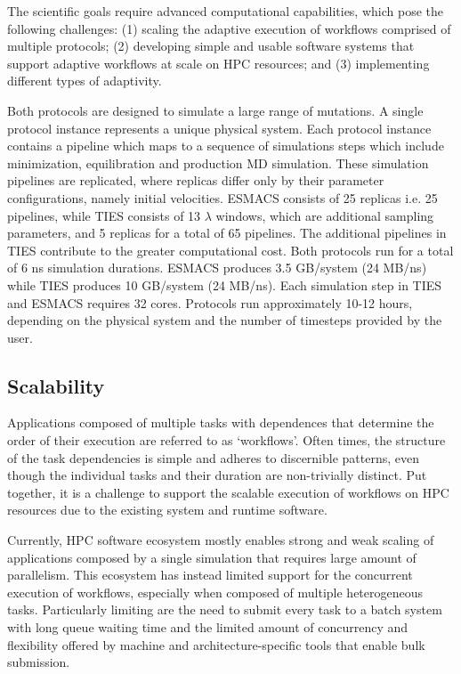 \documentclass[conference]{IEEEtran}
\begin{document}

The scientific goals require advanced computational capabilities, which pose
the following challenges: (1) scaling the adaptive execution of workflows
comprised of multiple protocols; (2) developing simple and usable software
systems that support adaptive workflows at scale on HPC resources; and (3)
implementing different types of adaptivity.

Both protocols are designed to simulate a large range of mutations. 
A single protocol instance represents a unique physical system. Each protocol 
instance contains a pipeline which maps to a sequence of simulations steps which 
include minimization, equilibration and production MD simulation. These 
simulation pipelines are replicated, where replicas differ only by their 
parameter configurations, namely initial velocities. ESMACS 
consists of 25 replicas i.e. 25 pipelines, while
TIES consists of 13 $\lambda$ windows, which are additional sampling
parameters, and 5 replicas for a total of 65 pipelines. The additional
pipelines in TIES contribute to the greater computational cost. Both protocols
run for a total of 6 ns simulation durations. ESMACS produces 3.5 GB/system
(24 MB/ns) while TIES produces 10 GB/system (24 MB/ns). Each simulation step
in TIES and ESMACS requires 32 cores. Protocols run approximately 10-12 hours,
depending on the physical system and the number of timesteps provided by the
user.

\subsection{Scalability}

Applications composed of multiple tasks with dependences that determine the
order of their execution are referred to as `workflows'. Often times, the
structure of the task dependencies is simple and adheres to discernible
patterns, even though the individual tasks and their duration are
non-trivially distinct. Put together, it is a challenge to support the
scalable execution of workflows on HPC resources due to the existing system
and runtime software.

Currently, HPC software ecosystem mostly enables strong and weak scaling of
applications composed by a single simulation that requires large amount of
parallelism. This ecosystem has instead limited support for the concurrent
execution of workflows, especially when composed of multiple heterogeneous
tasks. Particularly limiting are the need to submit every task to a batch
system with long queue waiting time and the limited amount of concurrency and
flexibility offered by machine and architecture-specific tools that enable
bulk submission.
\end{document}
